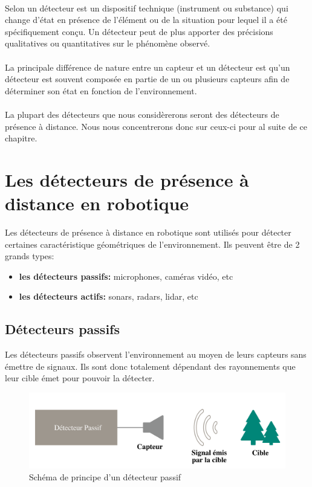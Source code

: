 \documentclass[12pt,a4paper]{report}
\begin{document}
\paragraph{} Selon \cite{wikipedia_detection_2017} un détecteur est un dispositif technique (instrument ou substance) qui change d'état en présence de l'élément ou de la situation pour lequel il a été spécifiquement conçu. Un détecteur peut de plus apporter des précisions qualitatives ou quantitatives sur le phénomène observé.

\paragraph{} La principale différence de nature entre un capteur et un détecteur est qu'un détecteur est souvent composée en partie de un ou plusieurs capteurs afin de déterminer son état en fonction de l'environnement.

\paragraph{} La plupart des détecteurs que nous considèrerons seront des détecteurs de présence à distance. Nous nous concentrerons donc sur ceux-ci pour al suite de ce chapitre.

\section{Les détecteurs de présence à distance en robotique}
Les détecteurs de présence à distance en robotique sont utilisés pour détecter certaines caractéristique géométriques de l'environnement. Ils peuvent être de 2 grands types:
\begin{itemize}
	\item \textbf{les détecteurs passifs:} microphones, caméras vidéo, etc
	\item \textbf{les détecteurs actifs:} sonars, radars, lidar, etc
\end{itemize}

\subsection{Détecteurs passifs}

Les détecteurs passifs observent l'environnement au moyen de leurs capteurs sans émettre de signaux. Ils sont donc totalement dépendant des rayonnements que leur cible émet pour pouvoir la détecter.

\begin{figure}[H]
	\centering
	\includegraphics[width=0.8\linewidth]{img/detecteurpassif}
	\caption{Schéma de principe d'un détecteur passif}
	\label{fig:detecteurpassif}
\end{figure}
\end{document}
